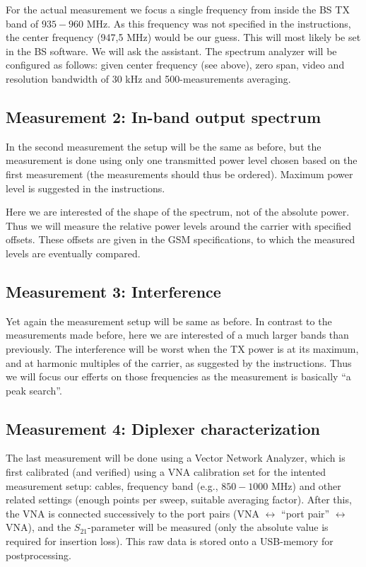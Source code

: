 \documentclass[a4paper, 12pt]{article}
\begin{document}
For the actual measurement we focus a single frequency from inside the 
BS TX band of $935 - 960$ MHz. As this frequency was not specified in 
the instructions, the center frequency (947,5 MHz) would be our guess.
This will most likely be set in the BS software. We will ask the assistant. 
The spectrum analyzer will be configured as follows: given center 
frequency (see above), zero span, video and resolution bandwidth of 
30 kHz and 500-measurements averaging.


\subsection*{Measurement 2: In-band output spectrum}

In the second measurement the setup will be the same as before, but 
the measurement is done using only one transmitted power level chosen 
based on the first measurement (the measurements should thus be ordered).
Maximum power level is suggested in the instructions.

Here we are interested of the shape of the spectrum, not of the absolute 
power. Thus we will measure the relative power levels around the carrier 
with specified offsets. These offsets are given in the GSM specifications, 
to which the measured levels are eventually compared.


\subsection*{Measurement 3: Interference}

Yet again the measurement setup will be same as before. In contrast to the 
measurements made before, here we are interested of a much larger bands than 
previously. The interference will be worst when the TX power is at its maximum, 
and at harmonic multiples of the carrier, as suggested by the instructions. 
Thus we will focus our efferts on those frequencies as the measurement is 
basically ``a peak search''.


\subsection*{Measurement 4: Diplexer characterization}

The last measurement will be done using a Vector Network Analyzer, which is 
first calibrated (and verified) using a VNA calibration set for the intented 
measurement setup: cables, frequency band (e.g., $850 - 1000$ MHz) and other 
related settings (enough points per sweep, suitable averaging factor). After 
this, the VNA is connected successively to the port pairs (VNA $\leftrightarrow$ 
``port pair'' $\leftrightarrow$ VNA), and the $S_{21}$-parameter 
will be measured (only the absolute value is required for insertion loss). 
This raw data is stored onto a USB-memory for postprocessing.
\end{document}
